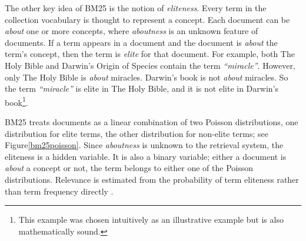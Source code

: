 The other key idea of BM25 is the notion of \textit{eliteness}. Every term in the collection vocabulary is thought to represent a concept. Each document can be \textit{about} one or more concepts, where \textit{aboutness} is an unknown feature of documents. If a term appears in a document and the document is \textit{about} the term's concept, then the term is \textit{elite} for that document. For example, both The Holy Bible and Darwin's Origin of Species contain the term \textit{``miracle''}. However, only The Holy Bible is \textit{about} miracles. Darwin's book is not \textit{about} miracles. So the term \textit{``miracle''} is elite in The Holy Bible, and it is not elite in Darwin's book\footnote{This example was chosen intuitively as an illustrative example but is also mathematically sound.}.

BM25 treats documents as a linear combination of two Poisson distributions, one distribution for elite terms, the other distribution for non-elite terms; see Figure\ref{bm25poisson}. Since \textit{aboutness} is unknown to the retrieval system, the eliteness is a hidden variable. It is also a binary variable; either a document is \textit{about} a concept or not, the term belongs to either one of the Poisson distributions. Relevance is estimated from the probability of term eliteness rather than term frequency directly \cite{bookstein1974probabilistic, harter1975probabilistic, robertson1995okapi}.

